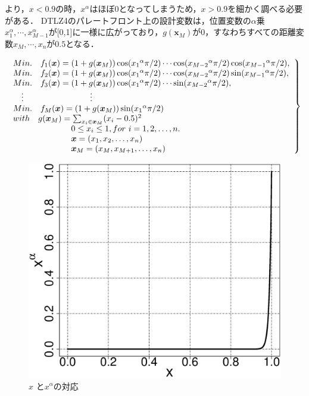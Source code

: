 \documentclass[../main/main]{subfiles}
\begin{document}
より，$x < 0.9$の時，$x^\alpha$はほぼ0となってしまうため，$x > 0.9$を細かく調べる必要がある．
DTLZ4のパレートフロント上の設計変数は，位置変数の$\alpha$乗$x^\alpha _1,\cdots,x^\alpha _{M-1}$が[0,1]に一様に広がっており，$g(\bm{x}_M)$が$0$，すなわちすべての距離変数$x_M,\cdots,x_n$が$0.5$となる．

\begin{eqnarray} 
\left.
\begin{array}{ll}
Min. \quad f_{1}  (\bm{x}) = (1+g(\bm{x}_{M}))\cos({x_{1}}^\alpha\pi/2)  \cdots  \cos({x_{M-2}}^\alpha\pi/2)\cos({x_{M-1}}^\alpha\pi/2),\\
Min. \quad f_{2} (\bm{x}) = (1+g(\bm{x}_{M}))\cos({x_{1}}^\alpha\pi/2)  \cdots  \cos({x_{M-2}}^\alpha\pi/2)\sin({x_{M-1}}^\alpha\pi/2), \\
Min. \quad f_{3} (\bm{x}) = (1+g(\bm{x}_{M}))\cos({x_{1}}^\alpha\pi/2)  \cdots  \sin({x_{M-2}}^\alpha\pi/2), \\
     \  \  \ $\vdots$    \qquad     \qquad      \qquad     \qquad \vdots \\
Min. \quad f_{M}(\bm{x}) = (1+g(\bm{x}_{M}))\sin({x_{1}}^\alpha\pi/2)\\
with \quad g(\bm{x}_{M}) = \sum_{x_i \in \bm{x}_M} (x_i - 0.5)^2  \\
  \qquad    \qquad    \qquad  \quad      0 \le x_{i} \le 1,  for \ i = 1, 2, \ldots, n. \\
        \qquad    \qquad    \qquad  \quad        \bm x = (x_1,x_2, \ldots, x_n)\\
   \qquad    \qquad    \qquad  \quad        \bm{x}_M = (x_M,x_{M+1}, \ldots, x_n)
   \label{dtlz4} 
\end{array}
\right\}
\end{eqnarray}


\begin{figure}[htbp]
\begin{center}
\centering
\includegraphics[width=0.4\linewidth]{../figures/dtlz4_position_sensitive.eps}
\end{center}
\setlength{\abovecaptionskip}{-8mm}
\setlength{\belowcaptionskip}{0mm}
\caption{$x$ と$x^ \alpha$の対応}
\label{dtlz4_x}
\end{figure}
\end{document}
